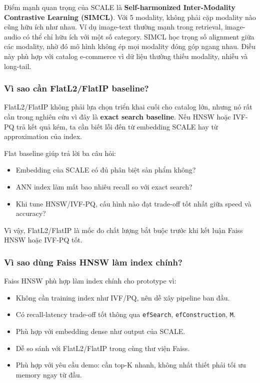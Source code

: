 \documentclass[12pt,a4paper]{article}
\begin{document}
Điểm mạnh quan trọng của SCALE là \textbf{Self-harmonized Inter-Modality Contrastive Learning (SIMCL)}. Với 5 modality, không phải cặp modality nào cũng hữu ích như nhau. Ví dụ image-text thường mạnh trong retrieval, image-audio có thể chỉ hữu ích với một số category. SIMCL học trọng số alignment giữa các modality, nhờ đó mô hình không ép mọi modality đóng góp ngang nhau. Điều này phù hợp với catalog e-commerce vì dữ liệu thường thiếu modality, nhiễu và long-tail.

\subsubsection{Vì sao cần FlatL2/FlatIP baseline?}
FlatL2/FlatIP không phải lựa chọn triển khai cuối cho catalog lớn, nhưng nó rất cần trong nghiên cứu vì đây là \textbf{exact search baseline}. Nếu HNSW hoặc IVF-PQ trả kết quả kém, ta cần biết lỗi đến từ embedding SCALE hay từ approximation của index.

Flat baseline giúp trả lời ba câu hỏi:
\begin{itemize}
  \item Embedding của SCALE có đủ phân biệt sản phẩm không?
  \item ANN index làm mất bao nhiêu recall so với exact search?
  \item Khi tune HNSW/IVF-PQ, cấu hình nào đạt trade-off tốt nhất giữa speed và accuracy?
\end{itemize}

Vì vậy, FlatL2/FlatIP là mốc đo chất lượng bắt buộc trước khi kết luận Faiss HNSW hoặc IVF-PQ tốt.

\subsubsection{Vì sao dùng Faiss HNSW làm index chính?}
Faiss HNSW phù hợp làm index chính cho prototype vì:
\begin{itemize}
  \item Không cần training index như IVF/PQ, nên dễ xây pipeline ban đầu.
  \item Có recall-latency trade-off tốt thông qua \texttt{efSearch}, \texttt{efConstruction}, \texttt{M}.
  \item Phù hợp với embedding dense như output của SCALE.
  \item Dễ so sánh với FlatL2/FlatIP trong cùng thư viện Faiss.
  \item Phù hợp với yêu cầu demo: cần top-K nhanh, không nhất thiết phải tối ưu memory ngay từ đầu.
\end{itemize}
\end{document}
